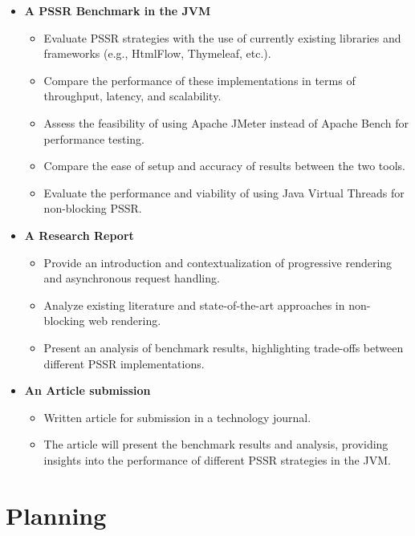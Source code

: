 \documentclass[a4paper,twoside,11pt]{article}
\begin{document}
\begin{itemize}
  \item \textbf{A PSSR Benchmark in the JVM}
        \begin{itemize}
          \item Evaluate PSSR strategies with the use of currently existing libraries and
                frameworks (e.g., HtmlFlow, Thymeleaf, etc.).
          \item Compare the performance of these implementations in terms of throughput,
                latency, and scalability.
          \item Assess the feasibility of using Apache JMeter instead of Apache Bench for
                performance testing.
          \item Compare the ease of setup and accuracy of results between the two tools.
          \item Evaluate the performance and viability of using Java Virtual Threads for
                non-blocking PSSR.
        \end{itemize}

  \item \textbf{A Research Report}
        \begin{itemize}
          \item Provide an introduction and contextualization of progressive rendering and
                asynchronous request handling.
          \item Analyze existing literature and state-of-the-art approaches in non-blocking web
                rendering.
          \item Present an analysis of benchmark results, highlighting trade-offs between
                different PSSR implementations.
        \end{itemize}

  \item \textbf{An Article submission}
        \begin{itemize}
          \item Written article for submission in a technology journal.
          \item The article will present the benchmark results and analysis, providing insights
                into the performance of different PSSR strategies in the JVM.
        \end{itemize}
\end{itemize}

\section{Planning}
\end{document}
